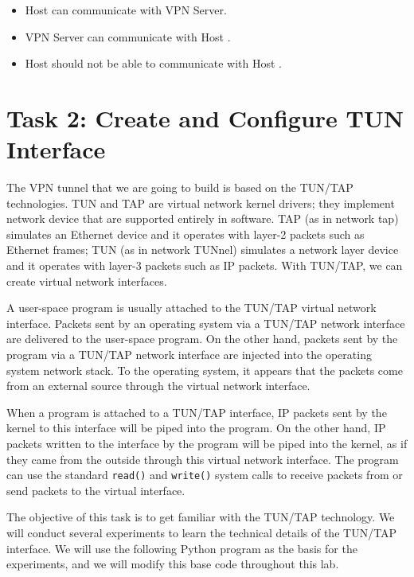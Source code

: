 \begin{itemize}[noitemsep]
\item Host \hostu can communicate with VPN Server.
\item VPN Server can communicate with Host \hostv.
\item Host \hostu should not be able to communicate with Host \hostv. 
\end{itemize}
 



\section{Task 2: Create and Configure TUN Interface}


The VPN tunnel that we are going to build is based on the TUN/TAP 
technologies. 
TUN and TAP are virtual network kernel drivers; they 
implement network device that are supported entirely in software.
TAP (as in network tap) simulates an Ethernet device and it operates with 
layer-2 packets such as Ethernet frames; TUN (as in network TUNnel) simulates a
network layer device and it operates with layer-3 packets such as IP packets.
With TUN/TAP, we can create virtual network interfaces. 


A user-space program is usually attached to the TUN/TAP virtual network interface.
Packets sent by an operating system via a TUN/TAP network interface 
are delivered to the user-space program. On the other hand,
packets sent by the program
via a TUN/TAP network interface are injected into the operating system
network stack. To the operating system,
it appears that the packets come from an external source
through the virtual network interface.


When a program is attached to a TUN/TAP interface, IP packets sent by
the kernel to this interface will be piped into the 
program. On the other hand, IP packets written to the 
interface by the program will be piped into the kernel, as if they came from 
the outside through this virtual network interface. The program can use 
the standard {\tt read()} and {\tt write()} system calls to receive packets 
from or send packets to the virtual interface.


The objective of this task is to get familiar with the TUN/TAP technology. 
We will conduct several experiments to learn the technical details
of the TUN/TAP interface. We will use the following Python program
as the basis for the experiments, and we will modify this base 
code throughout this lab. 



